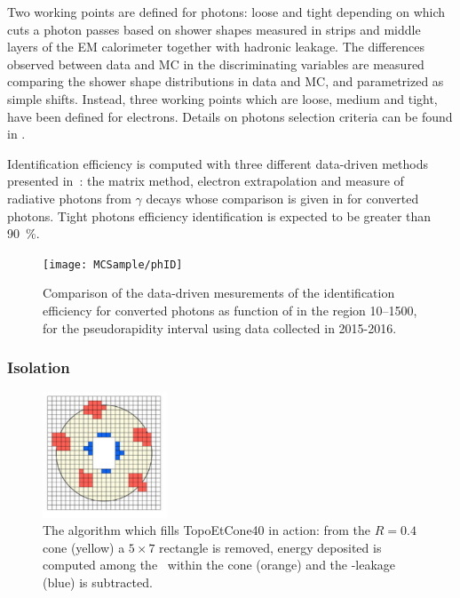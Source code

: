 Two working points are defined for photons: loose and tight depending on which cuts a photon passes based on shower shapes measured in strips and middle layers of the EM calorimeter together with hadronic leakage. The differences observed between data and MC in the discriminating variables are measured comparing the shower shape distributions in data and MC, and parametrized as simple shifts. Instead, three working points which are loose, medium and tight, have been defined for electrons. Details on photons selection criteria can be found in \cite[Sect. 4]{photons}.

Identification efficiency is computed with three different data-driven methods presented in~\cite{photons}: the matrix method, electron extrapolation and measure of radiative photons from  \Zboson\rarrow\ellell$\gamma$ decays whose comparison is given in \Fig{\ref{fig:phID}} for converted photons. Tight photons efficiency identification is expected to be greater than \SI{90}{\percent}.

\begin{figure}[pt]
\centering
\texttt{[image: MCSample/phID]}
\caption{Comparison of the data-driven mesurements of the identification efficiency for converted photons as function of \et in the region \SIrange{10}{1500}{\gev}, for the pseudorapidity interval  using data collected in 2015-2016.}
\label{fig:phID}
\end{figure}

\subsubsection{Isolation}
\label{sec:phisolation}
\begin{figure}[tp]
\centering
\includegraphics[width=0.33\textwidth]{MCSample/topoetcone40}
\caption{The algorithm which fills TopoEtCone40 in action: from the $R=0.4$ cone (yellow) a $5\times7$ rectangle is removed, energy deposited is computed among the \topo~within the cone (orange) and the \pt-leakage (blue) is subtracted.}
\label{topoetcone40}
\end{figure}

